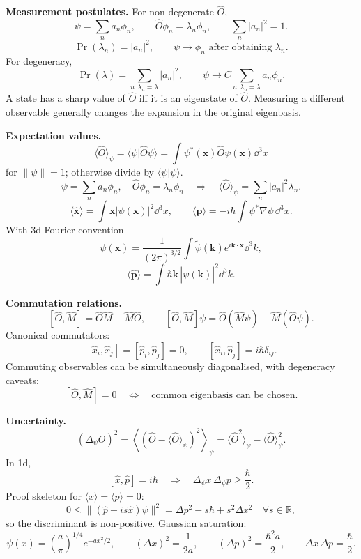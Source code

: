 \noindent\textbf{Measurement postulates.}
For non-degenerate \(\hat O\),
\[
\psi=\sum_n a_n\phi_n,\qquad \hat O\phi_n=\lambda_n\phi_n,\qquad
\sum_n |a_n|^2=1.
\]
\[
\boxed{\Pr(\lambda_n)=|a_n|^2},\qquad
\boxed{\psi\to\phi_n\text{ after obtaining }\lambda_n}.
\]
For degeneracy,
\[
\Pr(\lambda)=\sum_{n:\lambda_n=\lambda}|a_n|^2,\qquad
\psi\to C\sum_{n:\lambda_n=\lambda}a_n\phi_n.
\]
A state has a sharp value of \(\hat O\) iff it is an eigenstate of \(\hat O\).
Measuring a different observable generally changes the expansion in the original
eigenbasis.

\noindent\textbf{Expectation values.}
\[
\boxed{\langle\hat O\rangle_\psi=\langle\psi|\hat O\psi\rangle
=\int\psi^*(\mathbf{x})\hat O\psi(\mathbf{x})\dd^3x}
\]
for \(\|\psi\|=1\); otherwise divide by \(\langle\psi|\psi\rangle\).
\[
\psi=\sum_n a_n\phi_n,\quad \hat O\phi_n=\lambda_n\phi_n
\quad\Longrightarrow\quad
\langle\hat O\rangle_\psi=\sum_n |a_n|^2\lambda_n.
\]
\[
\langle\hat{\mathbf{x}}\rangle=\int\mathbf{x}|\psi(\mathbf{x})|^2\dd^3x,\qquad
\langle\hat{\mathbf{p}}\rangle=-i\hbar\int\psi^*\nabla\psi\,\dd^3x.
\]
With 3d Fourier convention
\[
\psi(\mathbf{x})=\frac{1}{(2\pi)^{3/2}}\int \tilde\psi(\mathbf{k})
e^{i\mathbf{k}\cdot\mathbf{x}}\dd^3k,
\]
\[
\langle\hat{\mathbf{p}}\rangle=\int \hbar\mathbf{k}\,|\tilde\psi(\mathbf{k})|^2\dd^3k.
\]

\noindent\textbf{Commutation relations.}
\[
[\hat O,\hat M]=\hat O\hat M-\hat M\hat O,\qquad
[\hat O,\hat M]\psi=\hat O(\hat M\psi)-\hat M(\hat O\psi).
\]
Canonical commutators:
\[
\boxed{[\hat x_i,\hat x_j]=[\hat p_i,\hat p_j]=0,\qquad
[\hat x_i,\hat p_j]=i\hbar\delta_{ij}}.
\]
Commuting observables can be simultaneously diagonalised, with degeneracy caveats:
\[
[\hat O,\hat M]=0\quad\Longleftrightarrow\quad
\text{common eigenbasis can be chosen}.
\]

\noindent\textbf{Uncertainty.}
\[
(\Delta_\psi O)^2=\left\langle(\hat O-\langle\hat O\rangle_\psi)^2\right\rangle_\psi
=\langle\hat O^2\rangle_\psi-\langle\hat O\rangle_\psi^2.
\]
In 1d,
\[
[\hat x,\hat p]=i\hbar
\quad\Longrightarrow\quad
\boxed{\Delta_\psi x\,\Delta_\psi p\ge \frac{\hbar}{2}}.
\]
Proof skeleton for \(\langle x\rangle=\langle p\rangle=0\):
\[
0\le\|(\hat p-is\hat x)\psi\|^2
=\Delta p^2-s\hbar+s^2\Delta x^2\quad\forall s\in\mathbb{R},
\]
so the discriminant is non-positive.
Gaussian saturation:
\[
\psi(x)=\left(\frac{a}{\pi}\right)^{1/4}e^{-ax^2/2},\qquad
(\Delta x)^2=\frac{1}{2a},\qquad
(\Delta p)^2=\frac{\hbar^2a}{2},\qquad
\Delta x\,\Delta p=\frac{\hbar}{2}.
\]


